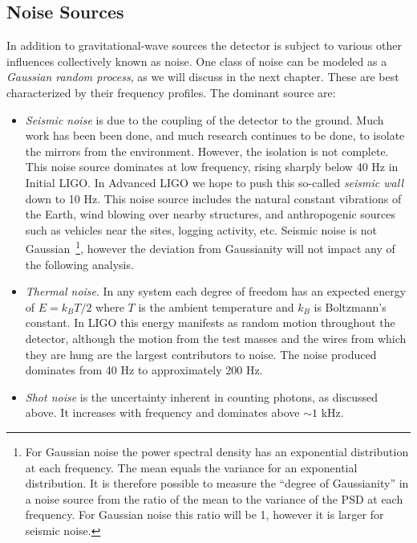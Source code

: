 \subsection{Noise Sources}
\label{sec:noise_sources}

In addition to gravitational-wave sources the detector is subject to
various other influences collectively known as noise.  One class of
noise can be modeled as a \emph{Gaussian random process}, as we will
discuss in the next chapter.  These are best characterized by their
frequency profiles.  The dominant source are:
%
\begin{itemize} \item \emph{Seismic noise} is due to the coupling of
the detector to the ground.  Much work has been been done, and much
research continues to be done, to isolate the mirrors from the
environment.  However, the isolation is not complete.  This noise
source dominates at low frequency, rising sharply below 40 Hz in
Initial LIGO.  In Advanced LIGO we hope to push this so-called
\emph{seismic wall} down to 10 Hz.  This noise source includes the
natural constant vibrations of the Earth, wind blowing over nearby
structures, and anthropogenic sources such as vehicles near the sites,
logging activity, etc.  Seismic noise is not Gaussian~\footnote{For
Gaussian noise the power spectral density has an exponential
distribution at each frequency.  The mean equals the variance for an
exponential distribution.  It is therefore possible to measure the
``degree of Gaussianity'' in a noise source from the ratio of the mean
to the variance of the PSD at each frequency.  For Gaussian noise this
ratio will be 1, however it is larger for seismic noise.}, however the
deviation from Gaussianity will not impact any of the following
analysis.

\item \emph{Thermal noise}. In any system each degree of freedom has
an expected energy of $E=k_B T/2$ where $T$ is the ambient temperature
and $k_B$ is Boltzmann's constant.  In LIGO this energy manifests as
random motion throughout the detector, although the motion from the
test masses and the wires from which they are hung are the largest
contributors to noise.  The noise produced dominates from 40 Hz to
approximately 200 Hz.

\item \emph{Shot noise} is the uncertainty inherent in counting
photons, as discussed above.  It increases with frequency and
dominates above $\sim 1$ kHz.

\end{itemize}
